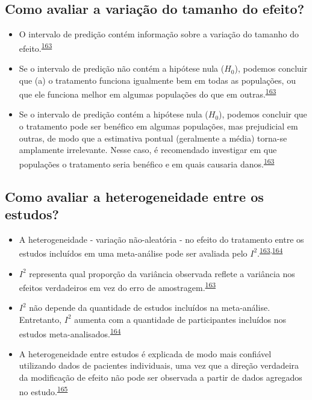\documentclass[
  a4paper,
]{book}
\begin{document}
\hypertarget{como-avaliar-a-variauxe7uxe3o-do-tamanho-do-efeito}{%
\subsection{Como avaliar a variação do tamanho do efeito?}\label{como-avaliar-a-variauxe7uxe3o-do-tamanho-do-efeito}}

\begin{itemize}
\item
  O intervalo de predição contém informação sobre a variação do tamanho do efeito.\textsuperscript{\protect\hyperlink{ref-Borenstein2022}{163}}
\item
  Se o intervalo de predição não contém a hipótese nula (\(H_{0}\)), podemos concluir que (a) o tratamento funciona igualmente bem em todas as populações, ou que ele funciona melhor em algumas populações do que em outras.\textsuperscript{\protect\hyperlink{ref-Borenstein2022}{163}}
\item
  Se o intervalo de predição contém a hipótese nula (\(H_{0}\)), podemos concluir que o tratamento pode ser benéfico em algumas populações, mas prejudicial em outras, de modo que a estimativa pontual (geralmente a média) torna-se amplamente irrelevante. Nesse caso, é recomendado investigar em que populações o tratamento seria benéfico e em quais causaria danos.\textsuperscript{\protect\hyperlink{ref-Borenstein2022}{163}}
\end{itemize}

\hypertarget{como-avaliar-a-heterogeneidade-entre-os-estudos}{%
\subsection{Como avaliar a heterogeneidade entre os estudos?}\label{como-avaliar-a-heterogeneidade-entre-os-estudos}}

\begin{itemize}
\item
  A heterogeneidade - variação não-aleatória - no efeito do tratamento entre os estudos incluídos em uma meta-análise pode ser avaliada pelo \(I^{2}\).\textsuperscript{\protect\hyperlink{ref-Borenstein2022}{163},\protect\hyperlink{ref-Ruxfccker2008}{164}}
\item
  \(I^{2}\) representa qual proporção da variância observada reflete a variância nos efeitos verdadeiros em vez do erro de amostragem.\textsuperscript{\protect\hyperlink{ref-Borenstein2022}{163}}
\item
  \(I^{2}\) não depende da quantidade de estudos incluídos na meta-análise. Entretanto, \(I^{2}\) aumenta com a quantidade de participantes incluídos nos estudos meta-analisados.\textsuperscript{\protect\hyperlink{ref-Ruxfccker2008}{164}}
\item
  A heterogeneidade entre estudos é explicada de modo mais confiável utilizando dados de pacientes individuais, uma vez que a direção verdadeira da modificação de efeito não pode ser observada a partir de dados agregados no estudo.\textsuperscript{\protect\hyperlink{ref-degrooth2023}{165}}
\end{itemize}
\end{document}
